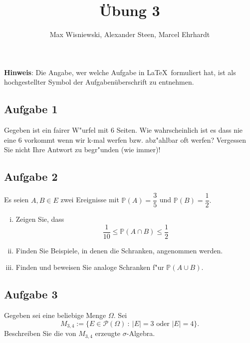 \documentclass[11pt,a4paper,ngerman]{article}
\date{}
\title{Übung 3}
\author{Max Wisniewski\maxw, Alexander Steen\alex, Marcel Ehrhardt\marcel}
\newcommand{\set}[1]{ \{ #1 \}}
\newcommand{\Prob}{\mathbb{P}}
\newcommand{\Pot}{\mathcal{P}}
\newcommand{\abs}[1]{ |#1|}
\begin{document}

\renewcommand{\figurename}{Figure}

\maketitle
\thispagestyle{fancy}

\begin{center}
\textbf{Hinweis}: Die Angabe, wer welche Aufgabe in \LaTeX\ formuliert hat, ist als hochgestellter Symbol der Aufgabenüberschrift zu entnehmen.
\end{center}


\subsection*{Aufgabe 1}
Gegeben ist ein fairer W"urfel mit 6 Seiten. Wie wahrscheinlich ist es dass nie eine
6 vorkommt wenn wir k-mal werfen bzw. abz"ahlbar oft werfen? Vergessen Sie nicht
Ihre Antwort zu begr"unden (wie immer)!

\subsection*{Aufgabe 2}
Es seien $A, B \in E$ zwei Ereignisse mit $\Prob(A) = \dfrac{3}{5}$ und $\Prob(B) = \dfrac{1}{2}.$

\begin{enumerate}[(i)]
  \item Zeigen Sie, dass \[\dfrac{1}{10} \le \Prob(A \cap B) \le \dfrac{1}{2}\]
  \item Finden Sie Beispiele, in denen die Schranken, angenommen werden.
  \item Finden und beweisen Sie analoge Schranken f"ur $\Prob(A \cup B)$.
\end{enumerate}

\subsection*{Aufgabe 3}

\newcommand{\SetM}{M_{3,4}}

Gegeben sei eine beliebige Menge $\Omega$. Sei \[
  \SetM := \set{E \in \Pot(\Omega)\ :\ \abs{E} = 3 \mbox{ oder } \abs{E} = 4}.
\]
Beschreiben Sie die von $\SetM$ erzeugte $\sigma$-Algebra.\\
\end{document}
